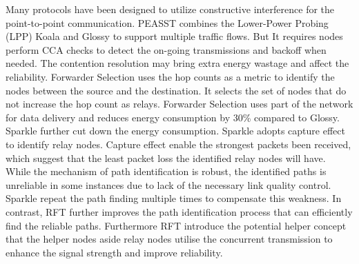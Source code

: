 \documentclass[conference]{IEEEtran}
\begin{document}
Many protocols have been designed to utilize constructive interference for the point-to-point communication. PEASST \cite{jeonglow} combines the Lower-Power Probing (LPP) Koala \cite{liang2008koala} and Glossy to support multiple traffic flows. But It requires nodes perform CCA checks to detect the on-going transmissions and backoff when needed. The contention resolution may bring extra energy wastage and affect the reliability. Forwarder Selection \cite{carlson2013forwarder} uses the hop counts as a metric to identify the nodes between the source and the destination. It selects the set of nodes that do not increase the hop count as relays. Forwarder Selection uses part of the network for data delivery and reduces energy consumption by 30\% compared to Glossy. Sparkle \cite{yuan2014making} further cut down the energy consumption. Sparkle adopts capture effect to identify relay nodes. Capture effect enable the strongest packets been received, which suggest that the least packet loss the identified relay nodes will have. While the mechanism of path identification is robust, the identified paths is unreliable in some instances due to lack of the necessary link quality control. Sparkle repeat the path finding multiple times to compensate this weakness. In contrast, RFT further improves the path identification process that can efficiently find the reliable paths. Furthermore RFT introduce the potential helper concept that the helper nodes aside relay nodes utilise the concurrent transmission to enhance the signal strength and improve reliability.


\end{document}
